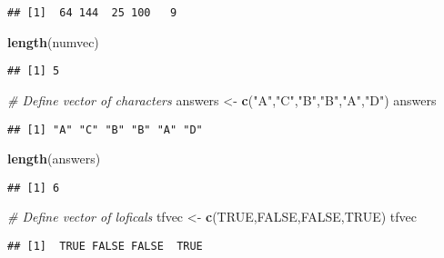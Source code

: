 \documentclass[
]{article}
\newenvironment{Shaded}{\begin{snugshade}}{\end{snugshade}}
\newcommand{\CommentTok}[1]{\textcolor[rgb]{0.56,0.35,0.01}{\textit{#1}}}
\newcommand{\ConstantTok}[1]{\textcolor[rgb]{0.56,0.35,0.01}{#1}}
\newcommand{\FunctionTok}[1]{\textcolor[rgb]{0.13,0.29,0.53}{\textbf{#1}}}
\newcommand{\NormalTok}[1]{#1}
\newcommand{\OtherTok}[1]{\textcolor[rgb]{0.56,0.35,0.01}{#1}}
\newcommand{\StringTok}[1]{\textcolor[rgb]{0.31,0.60,0.02}{#1}}
\begin{document}
\begin{verbatim}
## [1]  64 144  25 100   9
\end{verbatim}

\begin{Shaded}
\begin{Highlighting}[]
\FunctionTok{length}\NormalTok{(numvec)}
\end{Highlighting}
\end{Shaded}

\begin{verbatim}
## [1] 5
\end{verbatim}

\begin{Shaded}
\begin{Highlighting}[]
\CommentTok{\# Define vector of characters}
\NormalTok{answers }\OtherTok{\textless{}{-}} \FunctionTok{c}\NormalTok{(}\StringTok{"A"}\NormalTok{,}\StringTok{"C"}\NormalTok{,}\StringTok{"B"}\NormalTok{,}\StringTok{"B"}\NormalTok{,}\StringTok{"A"}\NormalTok{,}\StringTok{"D"}\NormalTok{)}
\NormalTok{answers}
\end{Highlighting}
\end{Shaded}

\begin{verbatim}
## [1] "A" "C" "B" "B" "A" "D"
\end{verbatim}

\begin{Shaded}
\begin{Highlighting}[]
\FunctionTok{length}\NormalTok{(answers)}
\end{Highlighting}
\end{Shaded}

\begin{verbatim}
## [1] 6
\end{verbatim}

\begin{Shaded}
\begin{Highlighting}[]
\CommentTok{\# Define vector of loficals}
\NormalTok{tfvec }\OtherTok{\textless{}{-}} \FunctionTok{c}\NormalTok{(}\ConstantTok{TRUE}\NormalTok{,}\ConstantTok{FALSE}\NormalTok{,}\ConstantTok{FALSE}\NormalTok{,}\ConstantTok{TRUE}\NormalTok{)}
\NormalTok{tfvec}
\end{Highlighting}
\end{Shaded}

\begin{verbatim}
## [1]  TRUE FALSE FALSE  TRUE
\end{verbatim}
\end{document}
